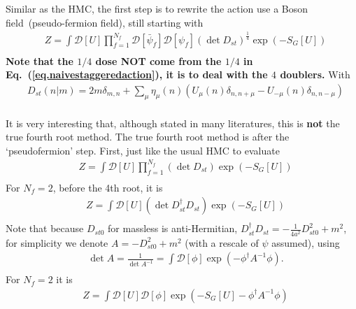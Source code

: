 Similar as the HMC, the first step is to rewrite the action use a Boson field~(pseudo-fermion field), still starting with
\begin{equation}
\begin{split}
&Z=\int \mathcal{D}[U] \prod _{f=1}^{N_f} \mathcal {D}[\bar{\psi}_f]\mathcal {D}[\psi _f]\left(\det D_{st}\right)^{\frac{1}{4}}\exp \left(-S_G[U]\right)\\
\end{split}
\end{equation}
\textbf{Note that the $1/4$ dose NOT come from the $1/4$ in Eq.~(\ref{eq.naivestaggeredaction}), it is to deal with the $4$ doublers.} With
\begin{equation}
\begin{split}
&D_{st}(n|m)=2m\delta _{m,n} + \sum _{\mu}\eta _{\mu}(n)\left(U_{\mu}(n) \delta _{n,n+\mu} - U_{-\mu}(n)\delta _{n,n-\mu}\right)\\
\end{split}
\end{equation}

It is very interesting that, although stated in many literatures, this is \textbf{\textcolor[rgb]{1,0,0}{not}} the true fourth root method. The true fourth root method is after the `pseudofermion' step. First, just like the usual HMC to evaluate
\begin{equation}
\begin{split}
&Z=\int \mathcal{D}[U] \prod _{f=1}^{N_f} \left(\det D_{st} \right)\exp \left(-S_G[U]\right)\\
\end{split}
\end{equation}
For $N_f=2$, before the 4th root, it is
\begin{equation}
\begin{split}
&Z=\int \mathcal{D}[U] \left(\det D_{st}^{\dagger}D_{st} \right)\exp \left(-S_G[U]\right)\\
\end{split}
\end{equation}
Note that because $D_{st0}$ for massless is anti-Hermitian, $D_{st}^{\dagger}D_{st}=-\frac{1}{4a^2}D_{st0}^2+m^2$, for simplicity we denote $A=-D_{st0}^2+m^2$ (with a rescale of $\psi$ assumed), using
\begin{equation}
\begin{split}
&\det A = \frac{1}{ \det A^{-1} }=\int \mathcal{D}[\phi] \exp (-\phi^{\dagger} A^{-1} \phi).\\
\end{split}
\end{equation}
For $N_f=2$ it is
\begin{equation}
\begin{split}
&Z=\int \mathcal{D}[U]  \mathcal {D}[\phi]\exp \left(-S_G[U]-\phi ^{\dagger} A^{-1} \phi \right)
\end{split}
\end{equation}

